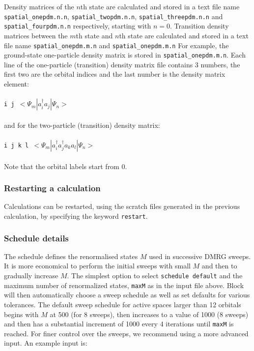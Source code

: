\documentclass[letterpaper,12pt,aps, pra]{revtex4-1}
\begin{document}
Density matrices of the $n$th state are
calculated and stored in a text file name \texttt{spatial\_onepdm.n.n}, 
\texttt{spatial\_twopdm.n.n}, \texttt{spatial\_threepdm.n.n} and \texttt{spatial\_fourpdm.n.n} respectively, starting with $n=0$. 
Transition density matrices between the $m$th state and $n$th state are calculated and 
stored in a text file name \texttt{spatial\_onepdm.m.n} and \texttt{spatial\_onepdm.m.n}
For example,
the ground-state one-particle density matrix is stored in
\texttt{spatial\_onepdm.m.n}.  Each line of the one-particle (transition) density matrix
file contains 3 numbers, the first two are the orbital indices and the last
number is the density matrix element:
\\ \texttt{ \\i j $<\Psi_m|a_i^\dag a_j|\Psi_n>$\\ }
\\and for the two-particle (transition) density matrix:
\\ \texttt{ \\i j k l $<\Psi_m|a_i^\dag
a_j^\dag a_k a_l|\Psi_n>$\\ } 
\\Note that the orbital labels start from 0.

\subsubsection{Restarting a calculation}
Calculations can be restarted, using the scratch files generated in the
previous calculation, by specifying the keyword \texttt{restart}.

\subsubsection{Schedule details}\label{sec:AppSched}
The schedule defines the renormalised states $M$ used in successive DMRG
sweeps. It is more economical to perform the initial sweeps with small $M$ and
then to gradually increase $M$. The simplest option to select \texttt{schedule
default} and the maximum number of renormalized states, \texttt{maxM} as in the
input file above. Block will then automatically choose a sweep schedule as well
as set defaults for various tolerances.  The default sweep schedule for active
spaces larger than 12 orbitals begins with $M$ at 500 (for 8 sweeps), then increases
to a value of 1000 (8 sweeps) and then has a substantial increment of 1000
every 4 iterations until \texttt{maxM} is reached. For finer
control over the sweeps, we recommend using a more advanced input. An example
input is:
\end{document}
